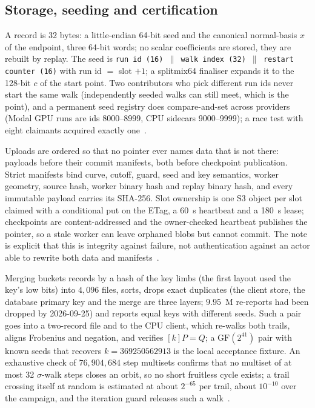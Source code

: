 \subsection{Storage, seeding and certification}
\label{sec:campaign-storage}

A record is 32 bytes: a little-endian 64-bit seed and the canonical
normal-basis $x$ of the endpoint, three 64-bit words; no scalar
coefficients are stored, they are rebuilt by replay. The seed is \texttt{run id (16) $\|$ walk index (32) $\|$ restart
counter (16)} with run id $=$ slot $+1$; a splitmix64 finaliser
expands it to the 128-bit $c$ of the start point. Two contributors who
pick different run ids never start the same walk (independently
seeded walks can still meet, which is the point), and a permanent seed
registry does compare-and-set across providers (Modal GPU runs are ids
8000--8999, CPU sidecars 9000--9999); a race test with eight claimants
acquired exactly one~.

Uploads are ordered so that no pointer ever names data that is not
there: payloads before their commit manifests, both before checkpoint
publication. Strict manifests bind curve, cutoff, guard, seed and key
semantics, worker geometry, source hash, worker binary hash and
replay binary hash, and every immutable payload carries its SHA-256.
Slot ownership is one S3 object per slot claimed with a conditional
put on the ETag, a 60~s heartbeat and a 180~s lease; checkpoints are
content-addressed and the owner-checked heartbeat publishes the
pointer, so a stale worker can leave orphaned blobs but cannot commit.
The note is explicit that this is integrity against failure, not
authentication against an actor able to rewrite both data and
manifests~.

Merging buckets records by a hash of the key limbs (the first layout
used the key's low bits) into $4{,}096$ files, sorts, drops exact duplicates (the client store, the database primary
key and the merge are three layers; $9.95$~M re-reports had been
dropped by 2026-09-25) and reports equal keys with different seeds.
Such a pair goes into a two-record file and to the CPU client, which
re-walks both trails, aligns Frobenius and negation, and verifies
$[k]P=Q$; a $\mathrm{GF}(2^{41})$ pair with known seeds that recovers
$k=369250562913$ is the local acceptance fixture. An exhaustive check of $76{,}904{,}684$ step multisets confirms that
no multiset of at most 32 $\sigma$-walk steps closes an orbit, so no
short fruitless cycle exists; a trail crossing itself at random is
estimated at about $2^{-65}$ per trail, about $10^{-10}$ over the
campaign, and the iteration guard releases such a
walk~.

